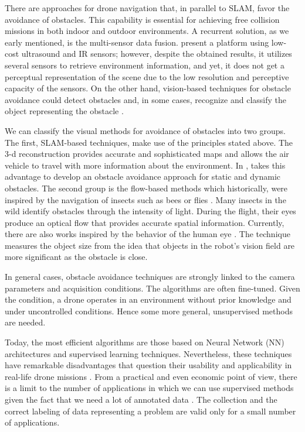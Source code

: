 There are approaches for drone navigation that, in parallel to SLAM, favor the avoidance of obstacles. This capability is essential for achieving free collision missions in both indoor and outdoor environments. A recurrent solution, as we early mentioned, is the multi-sensor data fusion. \cite{Gageik.Benz.ea:ACCESS:2015} present a platform using low-cost ultrasound and IR sensors; however, despite the obtained results, it utilizes several sensors to retrieve environment information, and yet, it does not get a perceptual representation of the scene due to the low resolution and perceptive capacity of the sensors. On the other hand, vision-based techniques for obstacle avoidance could detect obstacles and, in some cases, recognize and classify the object representing the obstacle \citep{Li.Ye.ea:IROS:2016}. 

We can classify the visual methods for avoidance of obstacles into two groups. The first, SLAM-based techniques, make use of the principles stated above. The 3-d reconstruction provides accurate and sophisticated maps and allows the air vehicle to travel with more information about the environment. In \citep{Moreno-Armendariz.Calvo:ICMEAE:2014}, takes this advantage to develop an obstacle avoidance approach for static and dynamic obstacles. The second group is the flow-based methods which historically, were inspired by the navigation of insects such as bees \citep{Srinivasan.Gregory:PTBS:1992} or flies \citep{Franceschini.Ruffier.ea:InTech:2009}. Many insects in the wild identify obstacles through the intensity of light. During the flight, their eyes produce an optical flow that provides accurate spatial information. Currently, there are also works inspired by the behavior of the human eye \citep{Al-Kaff.Meng.ea:IVS:2016}. The technique measures the object size from the idea that objects in the robot's vision field are more significant as the obstacle is close.

In general cases, obstacle avoidance techniques are strongly linked to the camera parameters and acquisition conditions. The algorithms are often fine-tuned. Given the condition, a drone operates in an environment without prior knowledge and under uncontrolled conditions. Hence some more general, unsupervised methods are needed.

Today, the most efficient algorithms are those based on Neural Network (NN) architectures and supervised learning techniques. Nevertheless, these techniques have remarkable disadvantages that question their usability and applicability in real-life drone missions \citep{Treboux.Genoud.ea:IWBIS:2018}. From a practical and even economic point of view, there is a limit to the number of applications in which we can use supervised methods given the fact that we need a lot of annotated data \citep{Xu.Wang.ea:CEA:2020}. The collection and the correct labeling of data representing a problem are valid only for a small number of applications.

